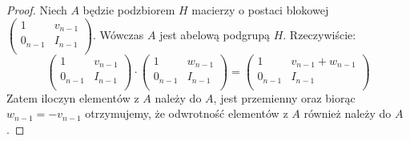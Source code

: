 \documentclass[licencjacka]{pracamgr}
\begin{document}
\begin{proof}
  Niech $A$ będzie podzbiorem $H$ macierzy o postaci blokowej
  $
    \left( \begin{array}{cc}
    1 & v_{n-1} \\
    0_{n-1} & I_{n-1} \\
    \end{array} \right)
  $.
  Wówczas $A$ jest abelową podgrupą $H$.
  Rzeczywiście:
  $$
    \left( \begin{array}{cc} 1 & v_{n-1} \\ 0_{n-1} & I_{n-1} \\ \end{array} \right) \cdot
    \left( \begin{array}{cc} 1 & w_{n-1} \\ 0_{n-1} & I_{n-1} \\ \end{array} \right) =
    \left( \begin{array}{cc} 1 & v_{n-1} + w_{n-1} \\ 0_{n-1} & I_{n-1} \\ \end{array} \right)
  $$
  Zatem iloczyn elementów z $A$ należy do $A$, jest przemienny oraz biorąc $w_{n-1} = -v_{n-1}$
  otrzymujemy, że odwrotność elementów z $A$ również należy do $A$.
  

\end{proof}
\end{document}
